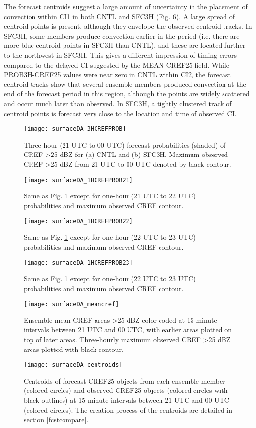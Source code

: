 The forecast centroids suggest a large amount of uncertainty in the placement of convection within CI1 in both CNTL and SFC3H (Fig. \ref{sfccentroids}). A large spread of centroid points is present, although they envelope the observed centroid tracks. In SFC3H, some members produce convection earlier in the period (i.e. there are more blue centroid points in SFC3H than CNTL), and these are located further to the northwest in SFC3H. This gives a different impression of timing errors compared to the delayed CI suggested by the MEAN-CREF25 field. While PROB3H-CREF25 values were near zero in CNTL within CI2, the forecast centroid tracks show that several ensemble members produced convection at the end of the forecast period in this region, although the points are widely scattered and occur much later than observed. In SFC3H, a tightly clustered track of centroid points is forecast very close to the location and time of observed CI.

\begin{figure}
\centering
\texttt{[image: surfaceDA\_3HCREFPROB]}
\caption{Three-hour (21 UTC to 00 UTC) forecast probabilities (shaded) of CREF \textgreater 25 dBZ for (a) CNTL and (b) SFC3H. Maximum observed CREF \textgreater 25 dBZ from 21 UTC to 00 UTC denoted by black contour.}
\label{sfc3hcrefprob}
\end{figure}
\begin{figure}
\centering
\texttt{[image: surfaceDA\_1HCREFPROB21]}
\caption{Same as Fig. \ref{sfc3hcrefprob} except for one-hour (21 UTC to 22 UTC) probabilities and maximum observed CREF contour.}
\label{sfc1hrprob21}
\end{figure}
\begin{figure}
\centering
\texttt{[image: surfaceDA\_1HCREFPROB22]}
\caption{Same as Fig. \ref{sfc3hcrefprob} except for one-hour (22 UTC to 23 UTC) probabilities and maximum observed CREF contour.}
\label{sfc1hrprob22}
\end{figure}
\begin{figure}
\centering
\texttt{[image: surfaceDA\_1HCREFPROB23]}
\caption{Same as Fig. \ref{sfc3hcrefprob} except for one-hour (22 UTC to 23 UTC) probabilities and maximum observed CREF contour.}
\label{sfc1hrprob23}
\end{figure}
\begin{figure}
\centering
\texttt{[image: surfaceDA\_meancref]}
\caption{Ensemble mean CREF areas \textgreater 25 dBZ color-coded at 15-minute intervals between 21 UTC and 00 UTC, with earlier areas plotted on top of later areas. Three-hourly maximum observed CREF \textgreater 25 dBZ areas plotted with black contour.}
\label{sfcmeancref}
\end{figure}
\begin{figure}
\centering
\texttt{[image: surfaceDA\_centroids]}
\caption{Centroids of forecast CREF25 objects from each ensemble member (colored circles) and observed CREF25 objects (colored circles with black outlines) at 15-minute intervals between 21 UTC and 00 UTC (colored circles). The creation process of the centroids are detailed in section \ref{fcstcompare}. }
\label{sfccentroids}
\end{figure}

